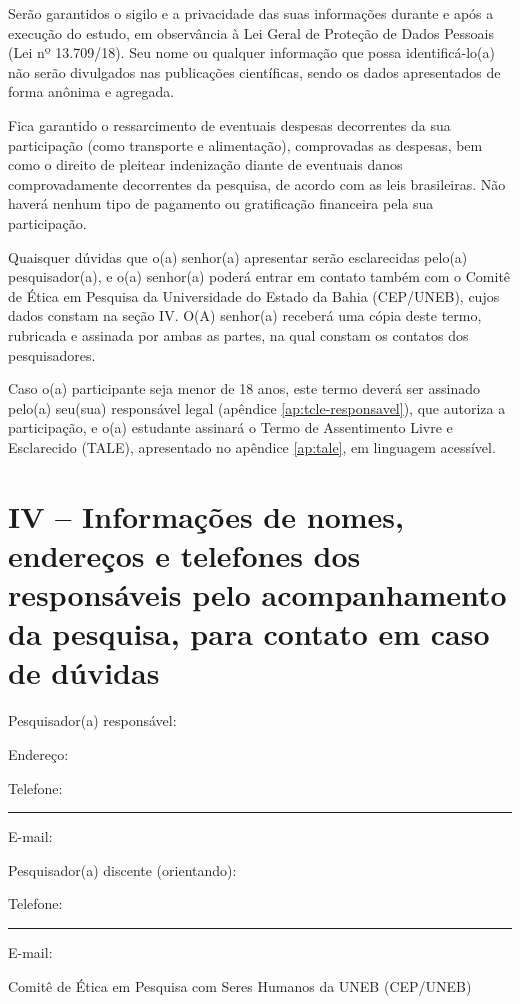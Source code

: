 Serão garantidos o sigilo e a privacidade das suas informações durante e após a execução do estudo, em observância à Lei Geral de Proteção de Dados Pessoais (Lei nº 13.709/18). Seu nome ou qualquer informação que possa identificá-lo(a) não serão divulgados nas publicações científicas, sendo os dados apresentados de forma anônima e agregada.

Fica garantido o ressarcimento de eventuais despesas decorrentes da sua participação (como transporte e alimentação), comprovadas as despesas, bem como o direito de pleitear indenização diante de eventuais danos comprovadamente decorrentes da pesquisa, de acordo com as leis brasileiras. Não haverá nenhum tipo de pagamento ou gratificação financeira pela sua participação.

Quaisquer dúvidas que o(a) senhor(a) apresentar serão esclarecidas pelo(a) pesquisador(a), e o(a) senhor(a) poderá entrar em contato também com o Comitê de Ética em Pesquisa da Universidade do Estado da Bahia (CEP/UNEB), cujos dados constam na seção IV. O(A) senhor(a) receberá uma cópia deste termo, rubricada e assinada por ambas as partes, na qual constam os contatos dos pesquisadores.

Caso o(a) participante seja menor de 18 anos, este termo deverá ser assinado pelo(a) seu(sua) responsável legal (apêndice \ref{ap:tcle-responsavel}), que autoriza a participação, e o(a) estudante assinará o Termo de Assentimento Livre e Esclarecido (TALE), apresentado no apêndice \ref{ap:tale}, em linguagem acessível.

\section{IV -- Informações de nomes, endereços e telefones dos responsáveis pelo acompanhamento da pesquisa, para contato em caso de dúvidas}

\noindent Pesquisador(a) responsável: \imprimirorientador

\noindent Endereço: \hrulefill

\noindent Telefone: \rule{4cm}{0.4pt}\hspace{0.8cm}E-mail: \hrulefill

\noindent Pesquisador(a) discente (orientando): \imprimirautor

\noindent Telefone: \rule{4cm}{0.4pt}\hspace{0.8cm}E-mail: \hrulefill

\noindent Comitê de Ética em Pesquisa com Seres Humanos da UNEB (CEP/UNEB)

